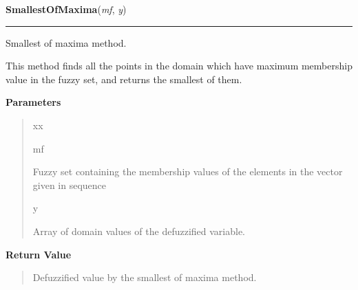    \begin{boxedminipage}{\textwidth}

    \raggedright \textbf{SmallestOfMaxima}(\textit{mf}, \textit{y})

    \vspace{-1.5ex}

    \rule{\textwidth}{0.5\fboxrule}

Smallest of maxima method.

This method finds all the points in the domain which have maximum membership
value in the fuzzy set, and returns the smallest of them.
    \vspace{1ex}

      \textbf{Parameters}
      \begin{quote}
        \begin{Ventry}{xx}

          \item[mf]


Fuzzy set containing the membership values of the elements in the
vector given in sequence
          \item[y]


Array of domain values of the defuzzified variable.
        \end{Ventry}

      \end{quote}

    \vspace{1ex}

      \textbf{Return Value}
      \begin{quote}

Defuzzified value by the smallest of maxima method.
      \end{quote}

    \vspace{1ex}

    \end{boxedminipage}

    \label{peach:fuzzy:defuzzy:LargestOfMaxima}

    \vspace{0.5ex}

